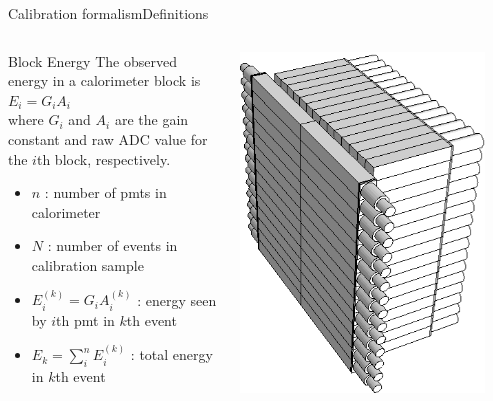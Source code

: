 \documentclass[aspectratio=169,xcolor=dvipsnames]{beamer}
\begin{document}
\begin{frame}{Calibration formalism}{Definitions}
  \begin{columns}
    \begin{column}[T]{0.7\textwidth}
      \begin{block}{Block Energy}
        \smaller
        The observed energy in a calorimeter block is \\
        $ E_i = G_i A_i$\\
        where $G_i$ and $A_i$ are the gain constant and raw ADC value for the $i$th block, respectively.  
      \end{block}
      \begin{itemize}
        \item $n$ : number of pmts in calorimeter
        \item $N$ : number of events in calibration sample
        \item $E_i^{(k)}= G_i A_i^{(k)}$ : energy seen by $i$th pmt in $k$th event
        \item $\displaystyle E_k = \sum_i^n E_i^{(k)}$ : total energy in $k$th event
      \end{itemize}


    \end{column}
    \begin{column}[T]{0.3\textwidth}
      \includegraphics[width=0.9\textwidth]{shms_calo_sk.eps}
    \end{column}
\end{columns}
\end{frame}
\end{document}
